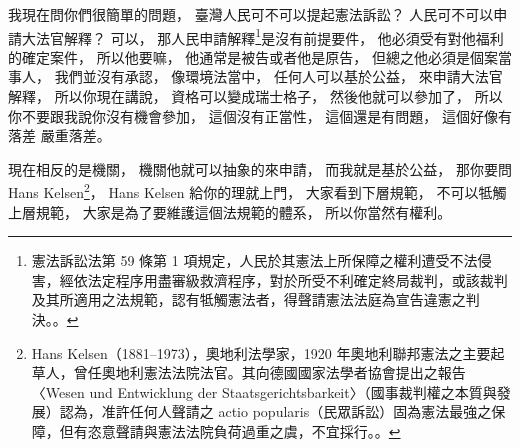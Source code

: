 \hypertarget{w06:cue:2911}{}我現在問你們很簡單的問題，
\hypertarget{w06:cue:2912}{}臺灣人民可不可以提起憲法訴訟？
\hypertarget{w06:cue:2913}{}人民可不可以申請大法官解釋？
\hypertarget{w06:cue:2914}{}可以，
\hypertarget{w06:cue:2915}{}那人民申請解釋\footnote{憲法訴訟法第 59 條第 1 項規定，人民於其憲法上所保障之權利遭受不法侵害，經依法定程序用盡審級救濟程序，對於所受不利確定終局裁判，或該裁判及其所適用之法規範，認有牴觸憲法者，得聲請憲法法庭為宣告違憲之判決。\cite[第 59 條]{csfa}。}是沒有前提要件，
\hypertarget{w06:cue:2916}{}他必須受有對他福利的確定案件，
\hypertarget{w06:cue:2917}{}所以他要嘛，
\hypertarget{w06:cue:2918}{}他通常是被告或者他是原告，
\hypertarget{w06:cue:2919}{}但總之他必須是個案當事人，
\hypertarget{w06:cue:2920}{}我們並沒有承認，
\hypertarget{w06:cue:2921}{}像環境法當中，
\hypertarget{w06:cue:2922}{}任何人可以基於公益，
\hypertarget{w06:cue:2923}{}來申請大法官解釋，
\hypertarget{w06:cue:2924}{}所以你現在講說，
\hypertarget{w06:cue:2925}{}資格可以變成瑞士格子，
\hypertarget{w06:cue:2926}{}然後他就可以參加了，
\hypertarget{w06:cue:2927}{}所以你不要跟我說你沒有機會參加，
\hypertarget{w06:cue:2928}{}這個沒有正當性，
\hypertarget{w06:cue:2929}{}這個還是有問題，
\hypertarget{w06:cue:2930}{}這個好像有落差 嚴重落差。

\hypertarget{w06:cue:2931}{}現在相反的是機關，
\hypertarget{w06:cue:2932}{}機關他就可以抽象的來申請，
\hypertarget{w06:cue:2933}{}而我就是基於公益，
\hypertarget{w06:cue:2934}{}那你要問 Hans Kelsen\footnote{Hans Kelsen（1881–1973），奧地利法學家，1920 年奧地利聯邦憲法之主要起草人，曾任奧地利憲法法院法官。其向德國國家法學者協會提出之報告〈Wesen und Entwicklung der Staatsgerichtsbarkeit〉（國事裁判權之本質與發展）認為，准許任何人聲請之 actio popularis（民眾訴訟）固為憲法最強之保障，但有恣意聲請與憲法法院負荷過重之虞，不宜採行。\cite[74]{kelsen1929}。}，
\hypertarget{w06:cue:2935}{}Hans Kelsen 給你的理就上門，
\hypertarget{w06:cue:2936}{}大家看到下層規範，
\hypertarget{w06:cue:2937}{}不可以牴觸上層規範，
\hypertarget{w06:cue:2938}{}大家是為了要維護這個法規範的體系，
\hypertarget{w06:cue:2939}{}所以你當然有權利。

